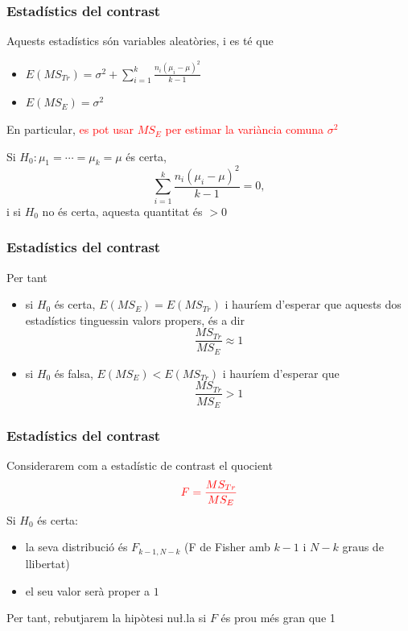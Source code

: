 \documentclass[12pt,t]{beamer}
\newcommand{\red}[1]{\textcolor{red}{#1}}
\renewcommand{\emph}[1]{{\color{red}#1}}
\theoremstyle{plain}
\theoremstyle{definition}
\begin{document}
\begin{frame}
\frametitle{Estadístics del contrast}

Aquests estadístics són variables aleatòries, i es té que
\begin{itemize}
\item $E(MS_{Tr})=\displaystyle\sigma^2 + \sum_{i=1}^k \frac{n_i (\mu_i
-\mu)^2}{k-1}$
\medskip

\item $E(MS_E)=\sigma^2$
\end{itemize}
\bigskip

En particular, \red{es pot usar $MS_E$ per estimar la
variància comuna $\sigma^2$}
\medskip


Si $H_0:\mu_1=\cdots=\mu_k=\mu$ és certa,
$$
\sum_{i=1}^k \frac{n_i (\mu_i -\mu)^2}{k-1}=0,
$$
i si $H_0$ no és certa, aquesta quantitat és $>0$

\end{frame}


\begin{frame}
\frametitle{Estadístics del contrast}

Per tant
\medskip

\begin{itemize}
\item si $H_0$ és certa, $E(MS_E)=E(MS_{Tr})$ i hauríem d'esperar que aquests dos estadístics  tinguessin valors propers, és a dir
$$
\frac{MS_{Tr}}{MS_E}\approx 1
$$
\item si $H_0$ és falsa, $E(MS_E)<E(MS_{Tr})$ i hauríem d'esperar que 
$$
\frac{MS_{Tr}}{MS_E}> 1
$$
\end{itemize}
\end{frame}


\begin{frame}
\frametitle{Estadístics del contrast}

Considerarem com a \emph{estadístic de contrast} el quocient 
$$
\red{F=\frac{MS_{Tr}}{MS_E}}
$$
Si $H_0$ és certa:
\medskip

\begin{itemize}
\item la seva distribució és $F_{k-1,N-k}$ (F de Fisher 
amb $k-1$ i $N-k$ graus de llibertat)
\medskip

\item el seu valor serà proper a $1$
\end{itemize}
\medskip

Per tant, rebutjarem la hipòtesi nu\l.la si $F$ és prou més gran que 1



\end{frame}
\end{document}
